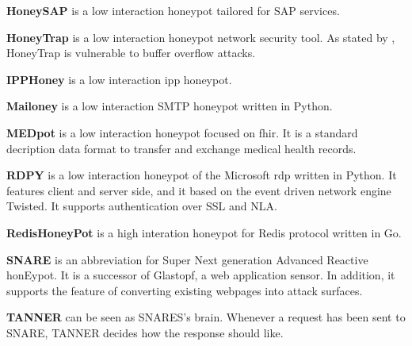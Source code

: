 \textbf{HoneySAP} \cite{honeysap2021} is a low interaction honeypot tailored for SAP services.

\textbf{HoneyTrap} \cite{honeytrap2021} is a low interaction honeypot network security tool.
As stated by \citet*{honeytrap2021}, HoneyTrap is vulnerable to buffer overflow attacks.

\textbf{IPPHoney} \cite{ipphoney2021} is a low interaction \ac{ipp} honeypot.

\textbf{Mailoney} is a low interaction SMTP honeypot written in Python.

\textbf{MEDpot} \cite{medpot2021} is a low interaction honeypot focused on \ac{fhir}. It is a standard decription data format to transfer and exchange medical health records.

\textbf{RDPY} \cite{rdpy2021} is a low interaction honeypot of the Microsoft \ac{rdp} written in Python.
It features client and server side, and it based on the event driven network engine Twisted.
It supports authentication over SSL and NLA.

\textbf{RedisHoneyPot} is a high interation honeypot for Redis protocol written in Go.

\textbf{SNARE} \cite{snare2021} is an abbreviation for Super Next generation Advanced Reactive honEypot.
It is a successor of Glastopf, a web application sensor.
In addition, it supports the feature of converting existing webpages into attack surfaces.

\textbf{TANNER} \cite{tanner2021} can be seen as SNARES's brain.
Whenever a request has been sent to SNARE, TANNER decides how the response should like.



